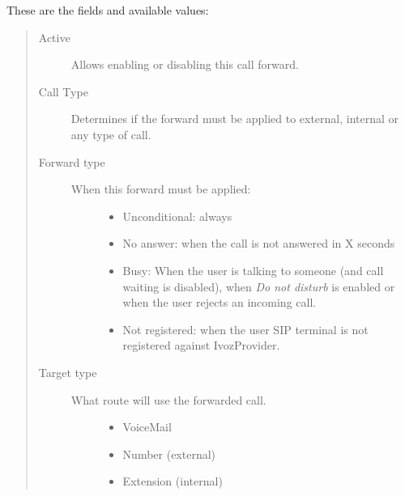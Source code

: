 \documentclass[letterpaper,10pt,spanish]{sphinxmanual}
\begin{document}
These are the fields and available values:
\begin{quote}
\begin{description}
\item[{Active}] \leavevmode
Allows enabling or disabling this call forward.

\item[{Call Type}] \leavevmode
Determines if the forward must be applied to external, internal or any
type of call.

\item[{Forward type}] \leavevmode\begin{description}
\item[{When this forward must be applied:}] \leavevmode\begin{itemize}
\item {} 
Unconditional: always

\item {} 
No answer: when the call is not answered in X seconds

\item {} 
Busy: When the user is talking to someone (and call waiting is
disabled), when \emph{Do not disturb} is enabled or when the user
rejects an incoming call.

\item {} 
Not registered: when the user SIP terminal is not registered
against IvozProvider.

\end{itemize}

\end{description}

\item[{Target type}] \leavevmode\begin{description}
\item[{What route will use the forwarded call.}] \leavevmode\begin{itemize}
\item {} 
VoiceMail

\item {} 
Number (external)

\item {} 
Extension (internal)

\end{itemize}

\end{description}

\end{description}
\end{quote}
\end{document}
